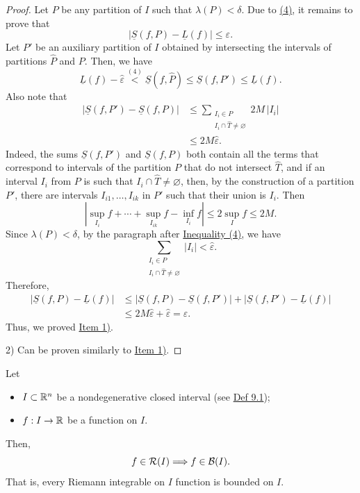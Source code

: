 \begin{proof}
Let $P$ be any partition of $I$ such that $\lambda(P)<\delta$.
Due to \hyperref[eq:9:4:1]{(4)}, it remains to prove that
\[
|\underline{S}(f,P)-\underline{L}(f)|\leq\varepsilon.
\]
Let $P'$ be an auxiliary partition of $I$ obtained by intersecting the intervals of partitions $\widehat P$ and $P$.
Then, we have
\[
\underline{L}(f)-\widehat\varepsilon
\overset{(4)}{<}\underline{S}(f,\widehat P)
\leq\underline{S}(f,P')
\leq\underline{L}(f).
\tag{5}\label{eq:9:5:1}
\]
Also note that
\begin{align*}
|\underline{S}(f,P')-\underline{S}(f,P)|
&\leq \sum_{\substack{I_i\in P\\I_i\cap\widehat T\neq\varnothing}}2M\,|I_i|\\
&\leq 2M\widehat\varepsilon.
\tag{6}\label{eq:9:6:1}
\end{align*}
Indeed, the sums $\underline{S}(f,P')$ and $\underline{S}(f,P)$ both contain all the terms that correspond to intervals of the partition $P$ that do not intersect $\widehat T$, and if an interval $I_i$ from $P$ is such that $I_i\cap\widehat T\neq\varnothing$, then, by the construction of a partition $P'$, there are intervals $I_{i1},\ldots,I_{ik}$ in $P'$ such that their union is $I_i$. Then
\[
\left|\sup_{I_i}f+\cdots+\sup_{I_{ik}}f-\inf_{I_i}f\right|\leq 2\sup_I f\leq2M.
\]
Since $\lambda(P)<\delta$, by the paragraph after \hyperref[eq:9:4:1]{Inequality (4)}, we have
\[
\sum_{\substack{I_i\in P\\I_i\cap\widehat T\neq\varnothing}}|I_i|<\widehat\varepsilon.
\]
Therefore,
\begin{align*}
|\underline{S}(f,P)-\underline{L}(f)|
&\leq |\underline{S}(f,P)-\underline{S}(f,P')|+|\underline{S}(f,P')-\underline{L}(f)|\\
&\leq 2M\widehat\varepsilon+\widehat\varepsilon
=\varepsilon.
\end{align*}
Thus, we proved \hyperref[item:claim:9.4:1]{Item 1)}.

2) Can be proven similarly to \hyperref[item:claim:9.4:1]{Item 1)}.
\end{proof}

\begin{claim}\label{claim:9.5}
Let
\begin{itemize}
    \item $I\subset\mathbb{R}^n$ be a nondegenerative closed interval (see \hyperref[def:9.1]{Def 9.1});
    \item $f:I\to\mathbb{R}$ be a function on $I$.
\end{itemize}
Then,
\[
f\in\mathcal{R}(I)\Longrightarrow f\in\mathcal{B}(I).
\]
That is, every Riemann integrable on $I$ function is bounded on $I$.
\end{claim}

